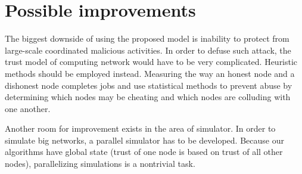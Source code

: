 \section*{Possible improvements}

The biggest downside of using the proposed model is inability to protect from large-scale coordinated malicious activities. In order to defuse such attack, the trust model of computing network would have to be very complicated. Heuristic methods should be employed instead. Measuring the way an honest node and a dishonest node completes jobs and use statistical methods to prevent abuse by determining which nodes may be cheating and which nodes are colluding with one another.

Another room for improvement exists in the area of simulator. In order to simulate big networks, a parallel simulator has to be developed. Because our algorithms have global state (trust of one node is based on trust of all other nodes), parallelizing simulations is a nontrivial task.